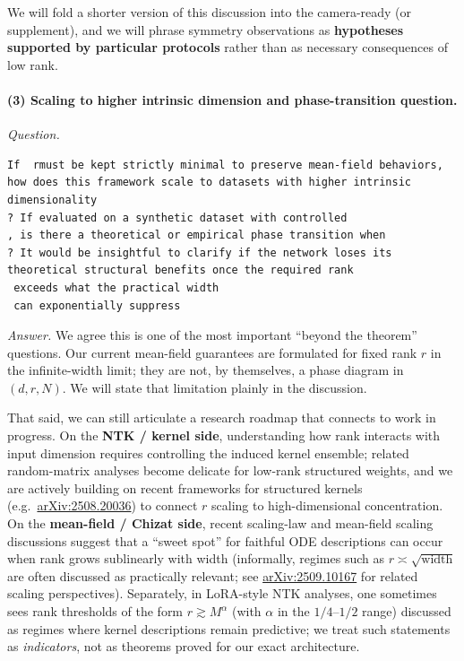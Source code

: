 \documentclass[11pt,a4paper]{article}
\begin{document}
We will fold a shorter version of this discussion into the camera-ready (or supplement), and we will phrase symmetry observations as \textbf{hypotheses supported by particular protocols} rather than as necessary consequences of low rank.

\paragraph{(3) Scaling to higher intrinsic dimension and phase-transition question.}
\textit{Question.}\par
\begin{verbatim}
If  rmust be kept strictly minimal to preserve mean-field behaviors, how does this framework scale to datasets with higher intrinsic dimensionality 
? If evaluated on a synthetic dataset with controlled 
, is there a theoretical or empirical phase transition when 
? It would be insightful to clarify if the network loses its theoretical structural benefits once the required rank 
 exceeds what the practical width 
 can exponentially suppress
\end{verbatim}
\textit{Answer.} We agree this is one of the most important ``beyond the theorem'' questions. Our current mean-field guarantees are formulated for fixed rank $r$ in the infinite-width limit; they are not, by themselves, a phase diagram in $(d,r,N)$. We will state that limitation plainly in the discussion.

That said, we can still articulate a research roadmap that connects to work in progress. On the \textbf{NTK / kernel side}, understanding how rank interacts with input dimension requires controlling the induced kernel ensemble; related random-matrix analyses become delicate for low-rank structured weights, and we are actively building on recent frameworks for structured kernels (e.g.\ \href{https://arxiv.org/abs/2508.20036}{arXiv:2508.20036}) to connect $r$ scaling to high-dimensional concentration. On the \textbf{mean-field / Chizat side}, recent scaling-law and mean-field scaling discussions suggest that a ``sweet spot'' for faithful ODE descriptions can occur when rank grows sublinearly with width (informally, regimes such as $r\asymp \sqrt{\text{width}}$ are often discussed as practically relevant; see \href{https://arxiv.org/pdf/2509.10167}{arXiv:2509.10167} for related scaling perspectives). Separately, in LoRA-style NTK analyses, one sometimes sees rank thresholds of the form $r\gtrsim M^{\alpha}$ (with $\alpha$ in the $1/4$--$1/2$ range) discussed as regimes where kernel descriptions remain predictive; we treat such statements as \emph{indicators}, not as theorems proved for our exact architecture.
\end{document}
